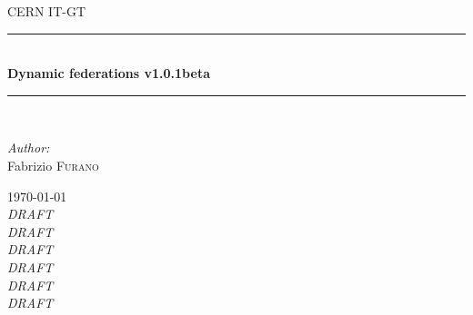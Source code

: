 \documentclass[12pt]{article} %
\begin{document}

\begin{titlepage}

\newcommand{\HRule}{\rule{\linewidth}{0.5mm}} %

\center %

\textsc{\LARGE CERN IT-GT}\\[1.5cm] %

\HRule \\[0.4cm]
{ \huge \bfseries Dynamic federations v1.0.1beta}\\[0.4cm] %
\HRule \\[1.5cm]

\begin{minipage}{0.4\textwidth}
\begin{flushleft} \large
\emph{Author:}\\
Fabrizio \textsc{Furano} \\ %
\end{flushleft}
\end{minipage}

{\large \today}\\[3cm] %


\emph{DRAFT}\\

\emph{DRAFT}\\

\emph{DRAFT}\\

\emph{DRAFT}\\

\emph{DRAFT}\\

\emph{DRAFT}\\


\vfill %

\end{titlepage}
\end{document}
